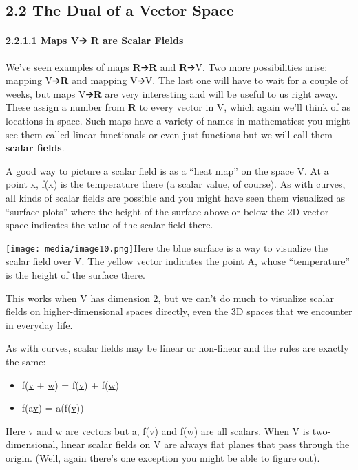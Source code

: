 \documentclass[oneside,english]{amsbook}
\numberwithin{section}{chapter}
\theoremstyle{plain}
\theoremstyle{definition}
\begin{document}
\subsection{2.2 The Dual of a Vector
	Space}\label{the-dual-of-a-vector-space}

\paragraph{\texorpdfstring{2.2.1.1 Maps V🡪 \textbf{R} are Scalar
		Fields}{2.2.1.1 Maps V🡪 R are Scalar Fields}}\label{maps-v-r-are-scalar-fields}

We've seen examples of maps \textbf{R}🡪\textbf{R} and \textbf{R}🡪V. Two
more possibilities arise: mapping V🡪\textbf{R} and mapping V🡪V. The last
one will have to wait for a couple of weeks, but maps V🡪\textbf{R} are
very interesting and will be useful to us right away. These assign a
number from \textbf{R} to every vector in V, which again we'll think of
as locations in space. Such maps have a variety of names in mathematics:
you might see them called linear functionals or even just functions but
we will call them \textbf{scalar fields}.

A good way to picture a scalar field is as a ``heat map'' on the space
V. At a point x, f(x) is the temperature there (a scalar value, of
course). As with curves, all kinds of scalar fields are possible and you
might have seen them visualized as ``surface plots'' where the height of
the surface above or below the 2D vector space indicates the value of
the scalar field there.

\texttt{[image: media/image10.png]}Here
the blue surface is a way to visualize the scalar field over V. The
yellow vector indicates the point A, whose ``temperature'' is the height
of the surface there.

This works when V has dimension 2, but we can't do much to visualize
scalar fields on higher-dimensional spaces directly, even the 3D spaces
that we encounter in everyday life.

As with curves, scalar fields may be linear or non-linear and the rules
are exactly the same:

\begin{itemize}
	\item
	f(\ul{v} + \ul{w}) = f(\ul{v}) + f(\ul{w})
	\item
	f(a\ul{v}) = a(f(\ul{v}))
\end{itemize}

Here \ul{v} and \ul{w} are vectors but a, f(\ul{v}) and f(\ul{w}) are
all scalars. When V is two-dimensional, linear scalar fields on V are
always flat planes that pass through the origin. (Well, again there's
one exception you might be able to figure out).
\end{document}
